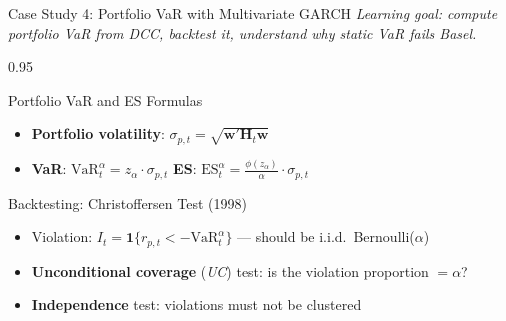 \documentclass[9pt, aspectratio=169, t]{beamer}
\begin{document}
\begin{frame}{Case Study 4: Portfolio VaR with Multivariate GARCH}
    \vspace{-2mm}
    {\scriptsize\textit{Learning goal: compute portfolio VaR from DCC, backtest it, understand why static VaR fails Basel.}}\vspace{1mm}
    \begin{cminipage}{0.95\textwidth}
    \vspace{-2mm}
    {\scriptsize
    \begin{block}{Portfolio VaR and ES Formulas}
        \begin{itemize}\setlength{\itemsep}{0pt}
            \item \textbf{Portfolio volatility}: $\sigma_{p,t} = \sqrt{\mathbf{w}'\mathbf{H}_t\mathbf{w}}$
            \item \textbf{VaR}: $\text{VaR}_t^\alpha = z_\alpha \cdot \sigma_{p,t}$ \quad \textbf{ES}: $\text{ES}_t^\alpha = \frac{\phi(z_\alpha)}{\alpha} \cdot \sigma_{p,t}$
        \end{itemize}
    \end{block}
    \vspace{-1mm}
    \begin{block}{Backtesting: Christoffersen Test (1998)}
        \begin{itemize}\setlength{\itemsep}{0pt}
            \item Violation: $I_t = \mathbf{1}\{r_{p,t} < -\text{VaR}_t^\alpha\}$ --- should be i.i.d.\ Bernoulli($\alpha$)
            \item \textbf{Unconditional coverage} (\textit{UC}) test: is the violation proportion $= \alpha$?
            \item \textbf{Independence} test: violations must not be clustered
        \end{itemize}
    \end{block}
    }
    \end{cminipage}
\end{frame}
\end{document}
